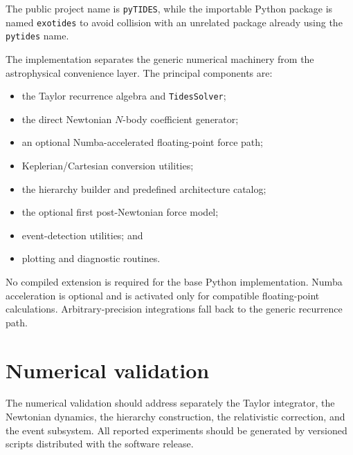 \documentclass[11pt]{article}
\begin{document}
The public project name is \texttt{pyTIDES}, while the importable Python
package is named \texttt{exotides} to avoid collision with an unrelated
package already using the \texttt{pytides} name.

The implementation separates the generic numerical machinery from the
astrophysical convenience layer. The principal components are:

\begin{itemize}
    \item the Taylor recurrence algebra and \texttt{TidesSolver};
    \item the direct Newtonian $N$-body coefficient generator;
    \item an optional Numba-accelerated floating-point force path;
    \item Keplerian/Cartesian conversion utilities;
    \item the hierarchy builder and predefined architecture catalog;
    \item the optional first post-Newtonian force model;
    \item event-detection utilities; and
    \item plotting and diagnostic routines.
\end{itemize}

No compiled extension is required for the base Python implementation.
Numba acceleration is optional and is activated only for compatible
floating-point calculations. Arbitrary-precision integrations fall back to
the generic recurrence path.


\section{Numerical validation}
\label{sec:validation}


The numerical validation should address separately the Taylor integrator, the
Newtonian dynamics, the hierarchy construction, the relativistic correction,
and the event subsystem. All reported experiments should be generated by
versioned scripts distributed with the software release.
\end{document}
